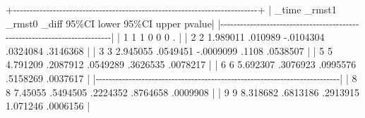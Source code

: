 \documentclass[
  12pt,
  letterpaper,
  DIV=11,
  numbers=noendperiod,
  onepage,
  openany]{scrreprt}
\newenvironment{Shaded}{\begin{snugshade}}{\end{snugshade}}
\newcommand{\DecValTok}[1]{\textcolor[rgb]{0.86,0.86,0.80}{#1}}
\newcommand{\ErrorTok}[1]{\textcolor[rgb]{0.76,0.75,0.62}{#1}}
\newcommand{\FloatTok}[1]{\textcolor[rgb]{0.75,0.75,0.82}{#1}}
\newcommand{\NormalTok}[1]{\textcolor[rgb]{0.80,0.80,0.80}{#1}}
\newcommand{\SpecialCharTok}[1]{\textcolor[rgb]{0.86,0.64,0.64}{#1}}
\begin{document}
\begin{Shaded}
\begin{Highlighting}[]
  \SpecialCharTok{+{-}{-}{-}{-}{-}{-}{-}{-}{-}{-}{-}{-}{-}{-}{-}{-}{-}{-}{-}{-}{-}{-}{-}{-}{-}{-}{-}{-}{-}{-}{-}{-}{-}{-}{-}{-}{-}{-}{-}{-}{-}{-}{-}{-}{-}{-}{-}{-}{-}{-}{-}{-}{-}{-}{-}{-}{-}{-}{-}{-}{-}{-}{-}{-}{-}{-}{-}{-}{-}{-}{-}{-}{-}{-}+}
  \ErrorTok{|}\NormalTok{ \_time     \_rmst1     \_rmst0      \_diff    }\DecValTok{95}\SpecialCharTok{\%CI lower 95\%}\NormalTok{CI upper  pvalue}\SpecialCharTok{|}
  \ErrorTok{|}\SpecialCharTok{{-}{-}{-}{-}{-}{-}{-}{-}{-}{-}{-}{-}{-}{-}{-}{-}{-}{-}{-}{-}{-}{-}{-}{-}{-}{-}{-}{-}{-}{-}{-}{-}{-}{-}{-}{-}{-}{-}{-}{-}{-}{-}{-}{-}{-}{-}{-}{-}{-}{-}{-}{-}{-}{-}{-}{-}{-}{-}{-}{-}{-}{-}{-}{-}{-}{-}{-}{-}{-}{-}{-}{-}{-}{-}}\ErrorTok{|}
  \ErrorTok{|}     \DecValTok{1}          \DecValTok{1}          \DecValTok{1}          \DecValTok{0}           \DecValTok{0}          \DecValTok{0}\NormalTok{          . }\SpecialCharTok{|}
  \ErrorTok{|}     \DecValTok{2}          \DecValTok{2}   \FloatTok{1.989011}\NormalTok{    .}\DecValTok{010989}   \SpecialCharTok{{-}}\NormalTok{.}\DecValTok{0104304}\NormalTok{   .}\DecValTok{0324084}\NormalTok{   .}\DecValTok{3146368} \SpecialCharTok{|}
  \ErrorTok{|}     \DecValTok{3}          \DecValTok{3}   \FloatTok{2.945055}\NormalTok{   .}\DecValTok{0549451}   \SpecialCharTok{{-}}\NormalTok{.}\DecValTok{0009099}\NormalTok{      .}\DecValTok{1108}\NormalTok{   .}\DecValTok{0538507} \SpecialCharTok{|}
  \ErrorTok{|}     \DecValTok{5}          \DecValTok{5}   \FloatTok{4.791209}\NormalTok{   .}\DecValTok{2087912}\NormalTok{    .}\DecValTok{0549289}\NormalTok{   .}\DecValTok{3626535}\NormalTok{   .}\DecValTok{0078217} \SpecialCharTok{|}
  \ErrorTok{|}     \DecValTok{6}          \DecValTok{6}   \FloatTok{5.692307}\NormalTok{   .}\DecValTok{3076923}\NormalTok{    .}\DecValTok{0995576}\NormalTok{   .}\DecValTok{5158269}\NormalTok{   .}\DecValTok{0037617} \SpecialCharTok{|}
  \ErrorTok{|}\SpecialCharTok{{-}{-}{-}{-}{-}{-}{-}{-}{-}{-}{-}{-}{-}{-}{-}{-}{-}{-}{-}{-}{-}{-}{-}{-}{-}{-}{-}{-}{-}{-}{-}{-}{-}{-}{-}{-}{-}{-}{-}{-}{-}{-}{-}{-}{-}{-}{-}{-}{-}{-}{-}{-}{-}{-}{-}{-}{-}{-}{-}{-}{-}{-}{-}{-}{-}{-}{-}{-}{-}{-}{-}{-}{-}{-}}\ErrorTok{|}
  \ErrorTok{|}     \DecValTok{8}          \DecValTok{8}    \FloatTok{7.45055}\NormalTok{   .}\DecValTok{5494505}\NormalTok{    .}\DecValTok{2224352}\NormalTok{   .}\DecValTok{8764658}\NormalTok{   .}\DecValTok{0009908} \SpecialCharTok{|}
  \ErrorTok{|}     \DecValTok{9}          \DecValTok{9}   \FloatTok{8.318682}\NormalTok{   .}\DecValTok{6813186}\NormalTok{    .}\DecValTok{2913915}   \FloatTok{1.071246}\NormalTok{   .}\DecValTok{0006156} \SpecialCharTok{|}

\end{Highlighting}
\end{Shaded}
\end{document}
